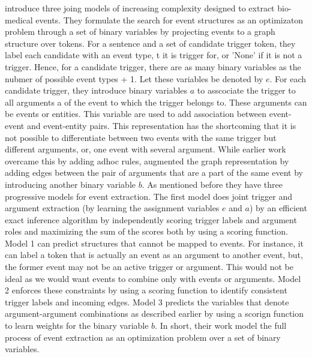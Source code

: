  introduce three joing models of increasing complexity designed to extract bio-medical events. They formulate the search for event structures as an optimizaton problem through a set of binary variables by projecting events to a graph structure over tokens. For a sentence and a set of candidate trigger token, they label each candidate with an event type, t it is trigger for, or 'None' if it is not a trigger. Hence, for a candidate trigger, there are as many binary variables as the nubmer of possible event types + 1. Let these variables be denoted by ${e}$. For each candidate trigger, they introduce binary variables ${a}$ to asscociate the trigger to all arguments a of the event to which the trigger belongs to. These arguments can be events or entities. This variable are used to add association between event-event and event-entity pairs. This representation has the shortcoming that it is not possible to differentiate between two events with the same trigger but different arguments, or, one event with several argument. While earlier work overcame this by adding adhoc rules, \citeauthor{riedelmc} augmented the graph representation by adding edges between the pair of arguments that are a part of the same event by introducing another binary variable ${b}$. As mentioned before they have three progressive models for event extraction. The first model does joint trigger and argument extraction (by learning the assignment variables ${e}$ and ${a}$) by an efficient exact inference algorithm by independently scoring trigger labels and argument roles and maximizing the sum of the scores both by using a scoring function. Model 1 can predict structures that cannot be mapped to events. For instance, it can label a token that is actually an event as an argument to another event, but, the former event may not be an active trigger or argument. This would not be ideal as we would want events to combine only with events or arguments. Model 2 enforces these constraints by using a scoring function to identify consistent trigger labels and incoming edges. Model 3 predicts the variables that denote argument-argument combinations as described earlier by using a scorign function to learn weights for the binary variable ${b}$. In short, their work model the full process of event extraction as an optimization problem over a set of binary variables.

